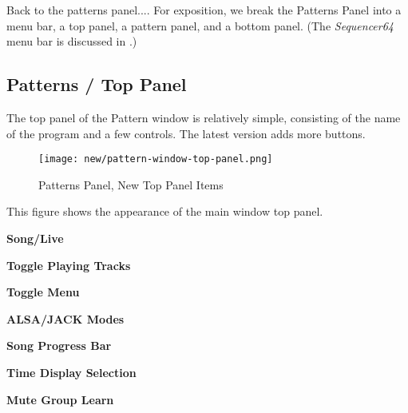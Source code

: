    Back to the patterns panel....  For exposition, we break the Patterns Panel
   into a menu bar, a top panel, a pattern panel, and a bottom panel.
   (The \textsl{Sequencer64} menu bar is discussed in
   .)

\subsection{Patterns / Top Panel}
\label{subsec:seq64_patterns_panel_top}

   The top panel of the Pattern window is relatively simple, consisting of the
   name of the program and a few controls.  The latest version adds more
   buttons.
   



\begin{figure}[H]
   \centering 
   \texttt{[image: new/pattern-window-top-panel.png]}
   \caption{Patterns Panel, New Top Panel Items}
   \label{fig:pattern_window_new_top_panel_items}
\end{figure}

   This figure shows the appearance of the main window top panel.
 
   \begin{enumber}
      \item \textbf{Song/Live}
      \item \textbf{Toggle Playing Tracks}
      \item \textbf{Toggle Menu}
      \item \textbf{ALSA/JACK Modes}
      \item \textbf{Song Progress Bar}
      \item \textbf{Time Display Selection}
      \item \textbf{Mute Group Learn}
   \end{enumber}

